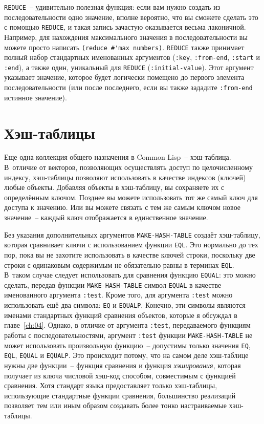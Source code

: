 \lstinline{REDUCE}~-- удивительно полезная функция: если вам нужно создать из
последовательности одно значение, вполне вероятно, что вы сможете сделать это с помощью
\lstinline{REDUCE}, и такая запись зачастую оказывается весьма лаконичной.
Например, для нахождения максимального значения в последовательности вы можете просто
написать \lstinline!(reduce #'max numbers)!. \lstinline{REDUCE} также принимает полный набор
стандартных именованных аргументов (\lstinline{:key}, \lstinline{:from-end}, \lstinline{:start} и
\lstinline{:end}), а также один, уникальный для \lstinline{REDUCE} (\lstinline{:initial-value}).  Этот
аргумент указывает значение, которое будет логически помещено до первого элемента
последовательности (или после последнего, если вы также зададите \lstinline{:from-end} истинное
значение).

\section{Хэш-таблицы}

Еще одна коллекция общего назначения в Common Lisp~-- хэш-таблица.  В~отличие от векторов,
позволяющих осуществлять доступ по целочисленному индексу,
хэш-таблицы позволяют использовать в качестве индексов (ключей) любые объекты.
Добавляя объекты в хэш-таблицу, вы сохраняете их с определённым ключом.  Позднее вы
можете использовать тот же самый ключ для доступа к значению.  Или вы можете связать
с тем же самым ключом новое значение~-- каждый ключ отображается в единственное значение.

Без указания дополнительных аргументов \lstinline{MAKE-HASH-TABLE} создаёт хэш-таблицу, которая
сравнивает ключи с использованием функции \lstinline{EQL}.  Это нормально до тех пор, пока вы
не захотите использовать в качестве ключей строки, поскольку две строки с одинаковым
содержимым не обязательно равны в терминах \lstinline{EQL}.  В~таком случае следует
использовать для сравнения функцию \lstinline{EQUAL}: это можно сделать, передав функции
\lstinline{MAKE-HASH-TABLE} символ \lstinline{EQUAL} в качестве именованного аргумента \lstinline{:test}.
Кроме того, для аргумента \lstinline{:test} можно использовать ещё два символа: \lstinline{EQ} и
\lstinline{EQUALP}.  Конечно, эти символы являются именами стандартных функций сравнения
объектов, которые я обсуждал в главе~\ref{ch:04}.  Однако, в отличие от аргумента \lstinline{:test},
передаваемого функциям работы с последовательностями, аргумент \lstinline{:test} функции
\lstinline{MAKE-HASH-TABLE} не может использовать произвольную функцию~-- допустимы только
значения \lstinline{EQ}, \lstinline{EQL}, \lstinline{EQUAL} и \lstinline{EQUALP}.  Это происходит потому, что
на самом деле хэш-таблице нужны две функции~-- функция сравнения и функция
\textit{хэширования}, которая получает из ключа числовой хэш-код способом, совместимым с
функцией сравнения.  Хотя стандарт языка предоставляет
только хэш-таблицы, использующие стандартные функции сравнения, большинство
реализаций позволяет тем или иным образом создавать более тонко настраиваемые
хэш-таблицы.

